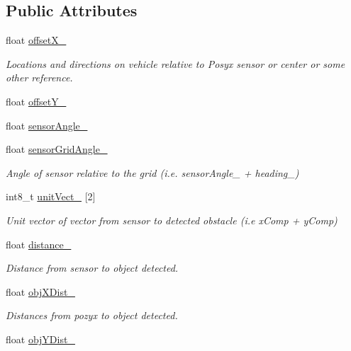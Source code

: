 \subsection*{Public Attributes}
\begin{DoxyCompactItemize}
\item 
float \mbox{\hyperlink{class_obstacle_sensor_ad660e8750c49e39615247660afbf35f4}{offset\+X\+\_\+}}
\begin{DoxyCompactList}\small\item\em Locations and directions on vehicle relative to Posyx sensor or center or some other reference. \end{DoxyCompactList}\item 
float \mbox{\hyperlink{class_obstacle_sensor_a491bcf65a2db112bc56b5c3af0c0fce7}{offset\+Y\+\_\+}}
\item 
float \mbox{\hyperlink{class_obstacle_sensor_a348cf9783f793442c56f1b34e3515dbb}{sensor\+Angle\+\_\+}}
\item 
float \mbox{\hyperlink{class_obstacle_sensor_a063ee604be2c3b6ed8034cafedda0c3d}{sensor\+Grid\+Angle\+\_\+}}
\begin{DoxyCompactList}\small\item\em Angle of sensor relative to the grid (i.\+e. sensor\+Angle\+\_\+ + heading\+\_\+) \end{DoxyCompactList}\item 
int8\+\_\+t \mbox{\hyperlink{class_obstacle_sensor_ae132590d90f75c4d8cfe26a98a315908}{unit\+Vect\+\_\+}} \mbox{[}2\mbox{]}
\begin{DoxyCompactList}\small\item\em Unit vector of vector from sensor to detected obstacle (i.\+e x\+Comp + y\+Comp) \end{DoxyCompactList}\item 
float \mbox{\hyperlink{class_obstacle_sensor_ac38c343c22e4f8afbde0b04b928f07cc}{distance\+\_\+}}
\begin{DoxyCompactList}\small\item\em Distance from sensor to object detected. \end{DoxyCompactList}\item 
float \mbox{\hyperlink{class_obstacle_sensor_a975d36873f7d0f9f2ddc2af247b56fc8}{obj\+X\+Dist\+\_\+}}
\begin{DoxyCompactList}\small\item\em Distances from pozyx to object detected. \end{DoxyCompactList}\item 
float \mbox{\hyperlink{class_obstacle_sensor_aeb1d3439a144640d73b07486dbfca10d}{obj\+Y\+Dist\+\_\+}}

\end{DoxyCompactItemize}
